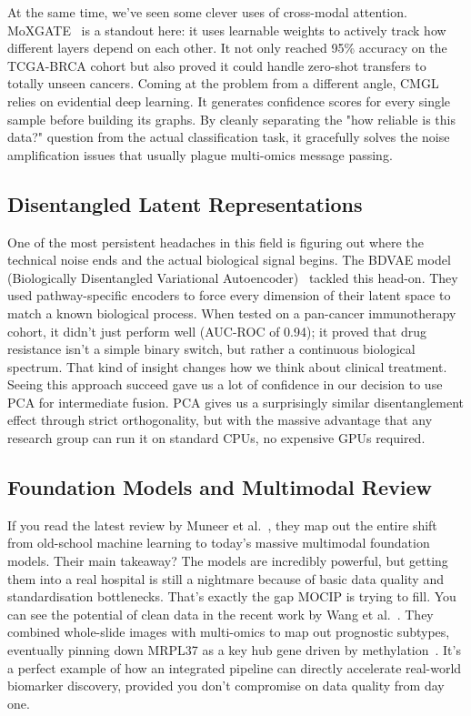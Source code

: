 \documentclass[runningheads]{llncs}
\begin{document}
At the same time, we've seen some clever uses of cross-modal attention. MoXGATE~\cite{dip2025moxgate} is a standout here: it uses learnable weights to actively track how different layers depend on each other. It not only reached 95\% accuracy on the TCGA-BRCA cohort but also proved it could handle zero-shot transfers to totally unseen cancers. Coming at the problem from a different angle, CMGL~\cite{fan2026cmgl} relies on evidential deep learning. It generates confidence scores for every single sample before building its graphs. By cleanly separating the "how reliable is this data?" question from the actual classification task, it gracefully solves the noise amplification issues that usually plague multi-omics message passing.

\subsection{Disentangled Latent Representations}
One of the most persistent headaches in this field is figuring out where the technical noise ends and the actual biological signal begins. The BDVAE model (Biologically Disentangled Variational Autoencoder)~\cite{tariq2025bdvae} tackled this head-on. They used pathway-specific encoders to force every dimension of their latent space to match a known biological process. When tested on a pan-cancer immunotherapy cohort, it didn't just perform well (AUC-ROC of 0.94); it proved that drug resistance isn't a simple binary switch, but rather a continuous biological spectrum. That kind of insight changes how we think about clinical treatment. Seeing this approach succeed gave us a lot of confidence in our decision to use PCA for intermediate fusion. PCA gives us a surprisingly similar disentanglement effect through strict orthogonality, but with the massive advantage that any research group can run it on standard CPUs, no expensive GPUs required.

\subsection{Foundation Models and Multimodal Review}
If you read the latest review by Muneer et al.~\cite{muneer2025review}, they map out the entire shift from old-school machine learning to today's massive multimodal foundation models. Their main takeaway? The models are incredibly powerful, but getting them into a real hospital is still a nightmare because of basic data quality and standardisation bottlenecks. That's exactly the gap MOCIP is trying to fill. You can see the potential of clean data in the recent work by Wang et al.~\cite{wang2025deeppathomic}. They combined whole-slide images with multi-omics to map out prognostic subtypes, eventually pinning down MRPL37 as a key hub gene driven by methylation~\cite{wang2025deeppathomic}. It's a perfect example of how an integrated pipeline can directly accelerate real-world biomarker discovery, provided you don't compromise on data quality from day one.
\end{document}
